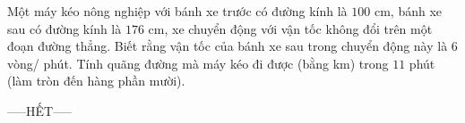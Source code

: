 \documentclass[12pt,a4paper]{article}
\begin{document}
\begin{ex}
 Một máy kéo nông nghiệp với bánh xe trước có đường kính là ${100}$ cm, bánh xe sau có đường kính là ${176}$ cm,  xe chuyển động với vận tốc không đổi trên một đoạn đường thẳng. Biết rằng vận tốc của bánh xe sau trong chuyển động này là ${6}$ vòng/ phút. Tính quãng đường mà máy kéo đi được (bằng km) trong ${11}$ phút (làm tròn đến hàng phần mười).\\ 

\end{ex}


 \begin{center}
-----HẾT-----
\end{center}

\newpage 
\end{document}
